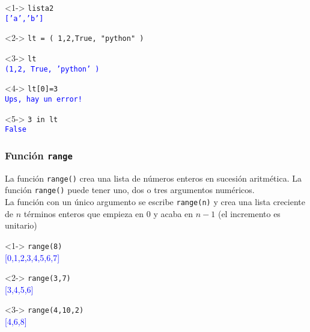 \documentclass[12pt]{beamer}
\begin{document}
\begin{frame}[fragile]
\begin{minipage}{5.5cm}
\begin{exampleblock}{}<1->
	\verb|lista2| \\
	\pause
	\textcolor{blue}{\texttt{['a','b']}}
\end{exampleblock}
\begin{exampleblock}{}<2->
	\verb|lt = ( 1,2,True, "python" )|
\end{exampleblock}
\end{minipage}
\hspace{0.5cm}
\begin{minipage}{5.5cm}
\begin{exampleblock}{}<3->
	\verb|lt| \\
	\pause
	\textcolor{blue}{\texttt{(1,2, True, 'python' )}}
\end{exampleblock}
\begin{exampleblock}{}<4->
	\verb|lt[0]=3| \\
	\pause
	\textcolor{blue}{\texttt{Ups, hay un error!}}
\end{exampleblock}
\begin{exampleblock}{}<5->
	\verb|3 in lt| \\
	\pause
	\textcolor{blue}{\texttt{False}}
\end{exampleblock}
\end{minipage}
\end{frame}
\begin{frame}[fragile]
\frametitle{Funci\'{o}n \texttt{range}}
La funci\'{o}n \texttt{range()} crea una lista de n\'{u}meros enteros en sucesi\'{o}n aritm\'{e}tica. La funci\'{o}n \texttt{range()} puede tener uno, dos o tres argumentos num\'{e}ricos.
\\
\bigskip
La funci\'{o}n con un \'{u}nico argumento se escribe \texttt{range(n)} y crea una lista creciente de $n$ t\'{e}rminos enteros que empieza en $0$ y acaba en $n-1$ (el incremento es unitario)
\fontsize{12}{12}\selectfont
\begin{minipage}{6cm}
\begin{exampleblock}{}<1->
	\verb|range(8)| \\
	\pause
	\textcolor{blue}{[0,1,2,3,4,5,6,7]}
\end{exampleblock}
\begin{exampleblock}{}<2->
	\verb|range(3,7)| \\
	\pause
	\textcolor{blue}{[3,4,5,6]}
\end{exampleblock}
\end{minipage}
\hspace{0.2cm}
\begin{minipage}{6cm}
\begin{exampleblock}{}<3->
	\verb|range(4,10,2)| \\
	\pause
	\textcolor{blue}{[4,6,8]}
\end{exampleblock}
\end{minipage}
\end{frame}
\end{document}
